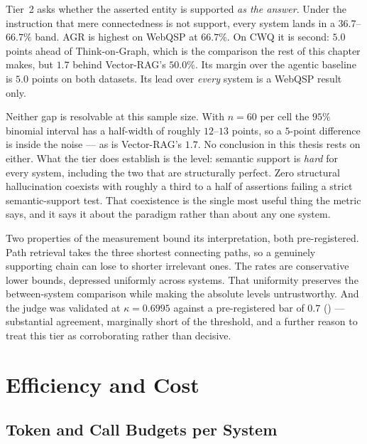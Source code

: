 Tier~2 asks whether the asserted entity is supported \emph{as the
answer}. Under the instruction that mere connectedness is
not support, every system lands in a $36.7$--$66.7\%$ band. AGR is highest on
WebQSP at $66.7\%$. On CWQ it is second: $5.0$ points ahead of Think-on-Graph,
which is the comparison the rest of this chapter makes, but $1.7$ behind
Vector-RAG's $50.0\%$. Its margin over the agentic baseline is $5.0$ points on
both datasets. Its lead over \emph{every} system is a WebQSP result only.

Neither gap is resolvable at this sample size. With $n = 60$ per cell the $95\%$
binomial interval has a half-width of roughly $12$--$13$ points, so a $5$-point
difference is inside the noise --- as is Vector-RAG's $1.7$. No
conclusion in this thesis rests on either. What the tier does establish is the
level: semantic support is \emph{hard} for every system, including the two that
are structurally perfect. Zero structural hallucination coexists with roughly a
third to a half of assertions failing a strict semantic-support test. That
coexistence is the single most useful thing the metric says, and it says it
about the paradigm rather than about any one system.

Two properties of the measurement bound its interpretation, both pre-registered.
Path retrieval takes the three shortest connecting paths, so a genuinely
supporting chain can lose to shorter irrelevant ones. The rates are conservative
lower bounds, depressed uniformly across systems. That uniformity preserves the
between-system comparison while making the absolute levels untrustworthy. And
the judge was validated at $\kappa = 0.6995$ against a pre-registered bar of
$0.7$ () --- substantial agreement, marginally short of the
threshold, and a further reason to treat this tier as corroborating rather than
decisive.

\section{Efficiency and Cost}\label{sec:efficiency}

\subsection{Token and Call Budgets per System}

